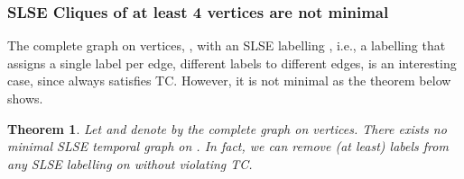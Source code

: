 \documentclass[a4paper,UKenglish]{article}
\newtheorem{theorem}{Theorem}
\begin{document}
\subsubsection{SLSE Cliques of at least 4 vertices are not minimal}\label{sec:clique_minimal}

The complete graph on  vertices, , with an SLSE labelling , i.e., a labelling that assigns a single label per edge, different labels to different edges, is an interesting case, since  always satisfies TC. However, it is not minimal as the theorem below shows.

\begin{theorem}\label{thm:clique_code}
Let  and denote by  the complete graph on  vertices. There exists \emph{no minimal} SLSE temporal graph on . In fact, we can remove (at least)  labels from any SLSE labelling on  without violating TC.
\end{theorem}
\end{document}

